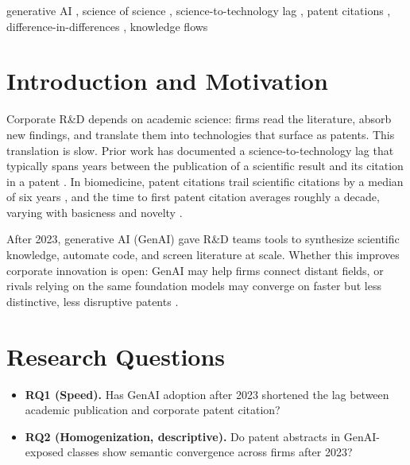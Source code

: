 \documentclass[
]{ceurart}
\begin{document}
\begin{abstract}
canon, and the movement is carried by the turn to generative-model patenting itself; the acceleration expectation that the same design tests against this one is not supported in any subsample.
\end{abstract}

\begin{keywords}
  generative AI \sep
  science of science \sep
  science-to-technology lag \sep
  patent citations \sep
  difference-in-differences \sep
  knowledge flows
\end{keywords}

\maketitle

\section{Introduction and Motivation}

Corporate R\&D depends on academic science: firms read the literature, absorb new findings, and translate them into technologies that surface as patents. This translation is slow. Prior work has documented a science-to-technology lag that typically spans years between the publication of a scientific result and its citation in a patent \cite{ahmadpoor2017dual, marx2020reliance}. In biomedicine, patent citations trail scientific citations by a median of six years \cite{ke2018comparing}, and the time to first patent citation averages roughly a decade, varying with basicness and novelty \cite{ke2020basicness}.

After 2023, generative AI (GenAI) gave R\&D teams tools to synthesize scientific knowledge, automate code, and screen literature at scale. Whether this improves corporate innovation is open: GenAI may help firms connect distant fields, or rivals relying on the same foundation models may converge on faster but less distinctive, less disruptive patents \cite{funk2017dynamic, park2023papers}.

\section{Research Questions}

\begin{itemize}
\item \textbf{RQ1 (Speed).} Has GenAI adoption after 2023 shortened the lag between academic publication and corporate patent citation?
\item \textbf{RQ2 (Homogenization, descriptive).} Do patent abstracts in GenAI-exposed classes show semantic convergence across firms after 2023?
\end{itemize}
\end{document}

